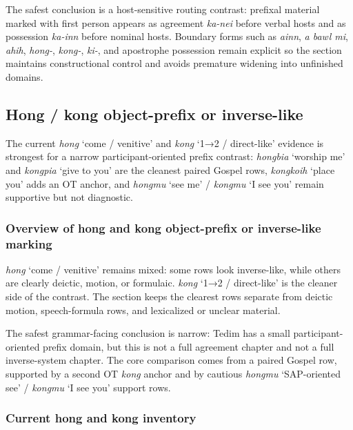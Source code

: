 \documentclass[
  11pt,
  a4paper,
]{article}
\newcommand{\tdim}[1]{\textit{#1}}
\newcommand{\glossquote}[1]{`#1'}
\begin{document}
The safest conclusion is a host-sensitive routing contrast: prefixal
material marked with first person appears as agreement \tdim{ka-nei}
before verbal hosts and as possession \tdim{ka-inn} before nominal
hosts. Boundary forms such as \tdim{ainn}, \tdim{a bawl mi},
\tdim{ahih}, \tdim{hong-}, \tdim{kong-}, \tdim{ki-}, and apostrophe
possession remain explicit so the section maintains constructional
control and avoids premature widening into unfinished domains.

\subsection{Hong / kong object-prefix or
inverse-like}\label{hong-kong-object-prefix-or-inverse-like}

The current \tdim{hong} \glossquote{come / venitive} and \tdim{kong}
\glossquote{1→2 / direct-like} evidence is strongest for a narrow
participant-oriented prefix contrast: \tdim{hongbia}
\glossquote{worship me} and \tdim{kongpia} \glossquote{give to you} are
the cleanest paired Gospel rows, \tdim{kongkoih} \glossquote{place you}
adds an OT anchor, and \tdim{hongmu} \glossquote{see me} / \tdim{kongmu}
\glossquote{I see you} remain supportive but not diagnostic.

\subsubsection{Overview of hong and kong object-prefix or inverse-like
marking}\label{overview-of-hong-and-kong-object-prefix-or-inverse-like-marking}

\tdim{hong} \glossquote{come / venitive} remains mixed: some rows look
inverse-like, while others are clearly deictic, motion, or formulaic.
\tdim{kong} \glossquote{1→2 / direct-like} is the cleaner side of the
contrast. The section keeps the clearest rows separate from deictic
motion, speech-formula rows, and lexicalized or unclear material.

The safest grammar-facing conclusion is narrow: Tedim has a small
participant-oriented prefix domain, but this is not a full agreement
chapter and not a full inverse-system chapter. The core comparison comes
from a paired Gospel row, supported by a second OT \tdim{kong} anchor
and by cautious \tdim{hongmu} \glossquote{SAP-oriented see} /
\tdim{kongmu} \glossquote{I see you} support rows.

\subsubsection{Current hong and kong
inventory}\label{current-hong-and-kong-inventory}
\end{document}
